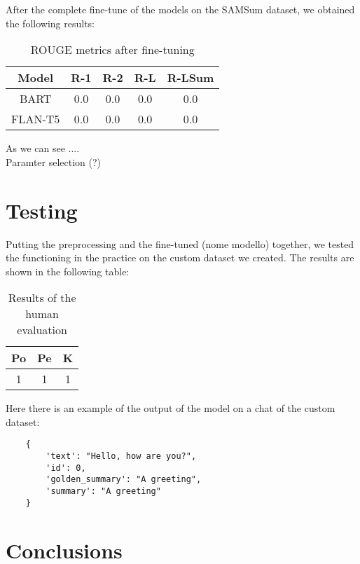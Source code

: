 \documentclass[10pt,twocolumn,letterpaper]{article}
\begin{document}
After the complete fine-tune of the models on the SAMSum dataset, we obtained the following results:
\begin{table}[h!]
    \centering
    \begin{tabular}{|c|c|c|c|c|}
        \hline
        Model & R-1 & R-2 & R-L & R-LSum \\ 
        \hline
        BART & 0.0 & 0.0 & 0.0 & 0.0\\
        FLAN-T5 & 0.0 & 0.0 & 0.0 & 0.0\\
        \hline
    \end{tabular}
    \caption{ROUGE metrics after fine-tuning}
    \label{table:ROUGEafterft}
\end{table}

As we can see .... \\
Paramter selection (?)

\section{Testing}
Putting the preprocessing and the fine-tuned (nome modello) together, we tested the functioning in the practice on the custom dataset we created. The results are shown in the following table:
\begin{table}[h!]
    \centering
    \begin{tabular}{|c|c|c|}
        \hline
        Po & Pe & K \\ 
        \hline
        1 & 1 & 1 \\
        \hline
    \end{tabular}
\caption{Results of the human evaluation}
\label{table:example}
\end{table}

Here there is an example of the output of the model on a chat of the custom dataset:
\begin{lstlisting}
    {
        'text': "Hello, how are you?",
        'id': 0,
        'golden_summary': "A greeting",
        'summary': "A greeting"
    }
\end{lstlisting}
\section{Conclusions}



\end{document}
